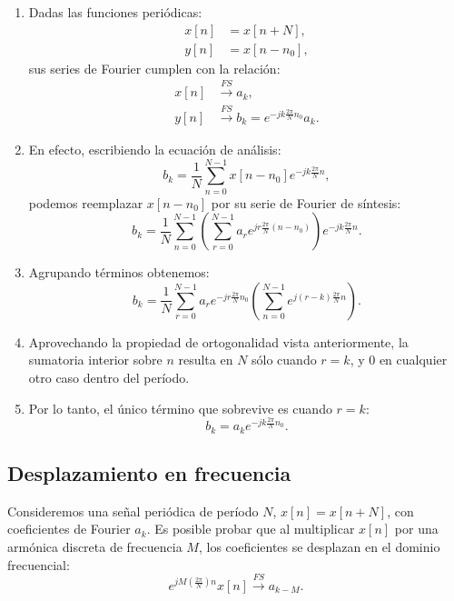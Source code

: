 \begin{enumerate}
	\item Dadas las funciones periódicas:
	\begin{align}
		x[n] &= x[n+N], \\
		y[n] &= x[n-n_{0}],
	\end{align}
	sus series de Fourier cumplen con la relación:
	\begin{align}
		x[n] &\xrightarrow{FS} a_{k}, \\
		y[n] &\xrightarrow{FS} b_{k} = e^{-jk\frac{2\pi}{N}n_{0}} a_{k}.
	\end{align}
	
	\item En efecto, escribiendo la ecuación de análisis:
	\begin{equation}
		b_{k} = \frac{1}{N} \sum_{n=0}^{N-1} x[n-n_{0}] e^{-jk\frac{2\pi}{N}n},
	\end{equation}
	podemos reemplazar $x[n-n_0]$ por su serie de Fourier de síntesis:
	\begin{equation}
		b_{k} = \frac{1}{N} \sum_{n=0}^{N-1} \left( \sum_{r=0}^{N-1} a_{r} e^{jr\frac{2\pi}{N}(n-n_{0})} \right) e^{-jk\frac{2\pi}{N}n}.
	\end{equation}
	
	\item Agrupando términos obtenemos:
	\begin{equation}
		b_{k} = \frac{1}{N} \sum_{r=0}^{N-1} a_{r} e^{-jr\frac{2\pi}{N}n_{0}} \left( \sum_{n=0}^{N-1} e^{j(r-k)\frac{2\pi}{N}n} \right).
	\end{equation}
	
	\item Aprovechando la propiedad de ortogonalidad vista anteriormente, la sumatoria interior sobre $n$ resulta en $N$ sólo cuando $r = k$, y $0$ en cualquier otro caso dentro del período.
	\item Por lo tanto, el único término que sobrevive es cuando $r=k$:
	\begin{equation}
		b_{k} = a_{k} e^{-jk\frac{2\pi}{N}n_{0}}.
	\end{equation}
\end{enumerate}

\subsection{Desplazamiento en frecuencia}

Consideremos una señal periódica de período $N$, $x[n] = x[n+N]$, con coeficientes de Fourier $a_{k}$. Es posible probar que al multiplicar $x[n]$ por una armónica discreta de frecuencia $M$, los coeficientes se desplazan en el dominio frecuencial:
\begin{equation}
	e^{jM\left(\frac{2\pi}{N}\right)n} x[n] \xrightarrow{FS} a_{k-M}.
\end{equation}

